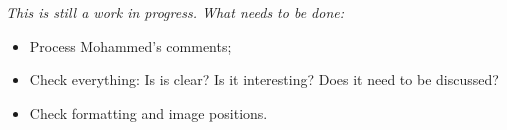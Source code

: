 \documentclass[twoside,openright,a4paper]{uva-bachelor-thesis}
\title{\course}
\subtitle{\assignment}
\author{Jimi M. van der Woning\\
        \url{Jimi.vanderWoning@student.uva.nl}\\
        Student ID 6061400
        }
\def \CurrChapter {}
\def \CurrSection {}
\renewcommand{\chaptermark}[1]{\def \CurrChapter {#1} \def \CurrSection {}}
\newenvironment{cframed}[2][white]
  {\def\FrameCommand{\fboxsep=\FrameSep\fcolorbox{#2}{#1}}%
    \MakeFramed {\advance\hsize-\width \FrameRestore}}
  {\endMakeFramed}
\newenvironment{colored}[1]
  {\color{#1}}
  {\ignorespacesafterend}
\newenvironment{todo}
  {
    \noindent
    \begin{cframed}{red}
      \begin{colored}{red}
        \it\noindent
        This is still a work in progress. What needs to be done:
        \begin{itemize}[noitemsep,nolistsep,leftmargin=15px]
  }
  {
        \end{itemize}
      \end{colored}
    \end{cframed}
  }
\begin{document}
\maketitle

\renewcommand*\arraystretch{1.5}
\ddmmyyyydate




\setlength{\parskip}{0px}
\setcounter{tocdepth}{1}
\tableofcontents
\setlength{\parskip}{.5em}

\begin{todo}
\item Process Mohammed's comments;
\item Check everything: Is is clear? Is it interesting? Does it need to be discussed?
\item Check formatting and image positions.
\end{todo}











\cleardoublepage
{}
{}


\chaptermark{Bibliography}

\appendix










\cleardoublepage
\end{document}
